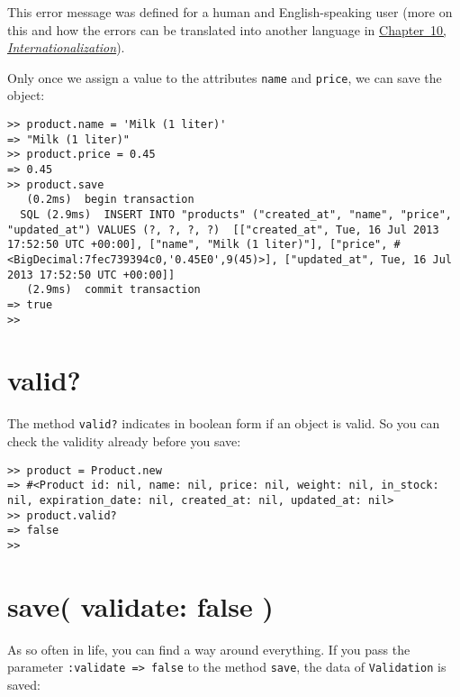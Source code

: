 \documentclass[a4paper]{book}
\begin{document}
This error message was defined for a human and English-speaking user (more on this and how the errors can be translated into another language in \hyperref[i18n]{Chapter~10, \emph{Internationalization}}).

Only once we assign a value to the attributes \texttt{name} and \texttt{price}, we can save the object:

\begin{shaded}\begin{verbatim}
>> product.name = 'Milk (1 liter)'
=> "Milk (1 liter)"
>> product.price = 0.45
=> 0.45
>> product.save
   (0.2ms)  begin transaction
  SQL (2.9ms)  INSERT INTO "products" ("created_at", "name", "price", "updated_at") VALUES (?, ?, ?, ?)  [["created_at", Tue, 16 Jul 2013 17:52:50 UTC +00:00], ["name", "Milk (1 liter)"], ["price", #<BigDecimal:7fec739394c0,'0.45E0',9(45)>], ["updated_at", Tue, 16 Jul 2013 17:52:50 UTC +00:00]]
   (2.9ms)  commit transaction
=> true
>>
\end{verbatim}\end{shaded}

\section{valid?}\label{valid}

The method \texttt{valid?} indicates in boolean form if an object is valid. So you can check the validity already before you save:

\begin{shaded}\begin{verbatim}
>> product = Product.new
=> #<Product id: nil, name: nil, price: nil, weight: nil, in_stock: nil, expiration_date: nil, created_at: nil, updated_at: nil>
>> product.valid?
=> false
>>
\end{verbatim}\end{shaded}

\section{save( validate: false )}\label{save-validate-false}

As so often in life, you can find a way around everything. If you pass the parameter \texttt{:validate =\textgreater{} false} to the method \texttt{save}, the data of \texttt{Validation} is saved:
\end{document}
